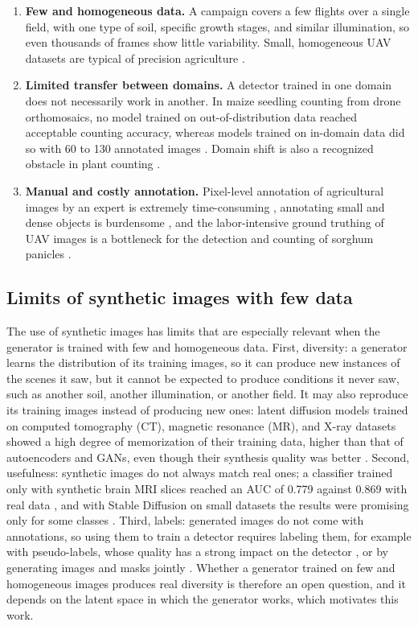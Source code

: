 \begin{enumerate}
  \item \textbf{Few and homogeneous data.} A campaign covers a few flights over a single field, with one type of soil, specific growth stages, and similar illumination, so even thousands of frames show little variability. Small, homogeneous UAV datasets are typical of precision agriculture \cite{Gonzalez2026}.
  \item \textbf{Limited transfer between domains.} A detector trained in one domain does not necessarily work in another. In maize seedling counting from drone orthomosaics, no model trained on out-of-distribution data reached acceptable counting accuracy, whereas models trained on in-domain data did so with 60 to 130 annotated images \cite{Bumbaca2025}. Domain shift is also a recognized obstacle in plant counting \cite{Ayalew2020}.
  \item \textbf{Manual and costly annotation.} Pixel-level annotation of agricultural images by an expert is extremely time-consuming \cite{Bah2018}, annotating small and dense objects is burdensome \cite{Ayalew2020}, and the labor-intensive ground truthing of UAV images is a bottleneck for the detection and counting of sorghum panicles \cite{Cai2022}.
\end{enumerate}

\subsection{Limits of synthetic images with few data}

The use of synthetic images has limits that are especially relevant when the generator is trained with few and homogeneous data. First, diversity: a generator learns the distribution of its training images, so it can produce new instances of the scenes it saw, but it cannot be expected to produce conditions it never saw, such as another soil, another illumination, or another field. It may also reproduce its training images instead of producing new ones: latent diffusion models trained on computed tomography (CT), magnetic resonance (MR), and X-ray datasets showed a high degree of memorization of their training data, higher than that of autoencoders and GANs, even though their synthesis quality was better \cite{Dar2024}. Second, usefulness: synthetic images do not always match real ones; a classifier trained only with synthetic brain MRI slices reached an AUC of 0.779 against 0.869 with real data \cite{Fallah2026}, and with Stable Diffusion on small datasets the results were promising only for some classes \cite{Deng2023}. Third, labels: generated images do not come with annotations, so using them to train a detector requires labeling them, for example with pseudo-labels, whose quality has a strong impact on the detector \cite{Fallas2025Pseudo}, or by generating images and masks jointly \cite{Kong2026}. Whether a generator trained on few and homogeneous images produces real diversity is therefore an open question, and it depends on the latent space in which the generator works, which motivates this work.

